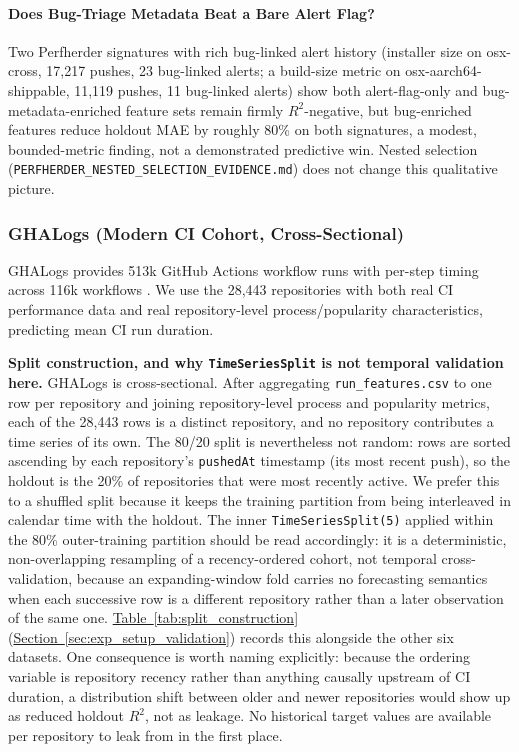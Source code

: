 \documentclass[technologies,article,submit,pdftex,moreauthors]{Definitions/mdpi}
\begin{document}
\paragraph{Does Bug-Triage Metadata Beat a Bare Alert Flag?}\label{sec:perfherder_bugs}

Two Perfherder signatures with rich bug-linked alert history (installer size on osx-cross, 17,217 pushes, 23 bug-linked alerts; a build-size metric on osx-aarch64-shippable, 11,119 pushes, 11 bug-linked alerts) show both alert-flag-only and bug-metadata-enriched feature sets remain firmly \(R^2\)-negative, but bug-enriched features reduce holdout MAE by roughly 80\% on both signatures, a modest, bounded-metric finding, not a demonstrated predictive win. Nested selection (\texttt{PERFHERDER\_NESTED\_SELECTION\_EVIDENCE.md}) does not change this qualitative picture.

\subsubsection{GHALogs (Modern CI Cohort, Cross-Sectional)}\label{sec:ghalogs}

GHALogs provides 513k GitHub Actions workflow runs with per-step timing across 116k workflows \citep{ghalogs2024}. We use the 28,443 repositories with both real CI performance data and real repository-level process/popularity characteristics, predicting mean CI run duration.

\textbf{Split construction, and why \texttt{TimeSeriesSplit} is not temporal validation here.} GHALogs is cross-sectional. After aggregating \texttt{run\_features.csv} to one row per repository and joining repository-level process and popularity metrics, each of the 28,443 rows is a distinct repository, and no repository contributes a time series of its own. The 80/20 split is nevertheless not random: rows are sorted ascending by each repository's \texttt{pushedAt} timestamp (its most recent push), so the holdout is the 20\% of repositories that were most recently active. We prefer this to a shuffled split because it keeps the training partition from being interleaved in calendar time with the holdout. The inner \texttt{TimeSeriesSplit(5)} applied within the 80\% outer-training partition should be read accordingly: it is a deterministic, non-overlapping resampling of a recency-ordered cohort, not temporal cross-validation, because an expanding-window fold carries no forecasting semantics when each successive row is a different repository rather than a later observation of the same one. \hyperref[tab:split_construction]{Table~\ref*{tab:split_construction}} (\hyperref[sec:exp_setup_validation]{Section~\ref*{sec:exp_setup_validation}}) records this alongside the other six datasets. One consequence is worth naming explicitly: because the ordering variable is repository recency rather than anything causally upstream of CI duration, a distribution shift between older and newer repositories would show up as reduced holdout \(R^2\), not as leakage. No historical target values are available per repository to leak from in the first place.
\end{document}
